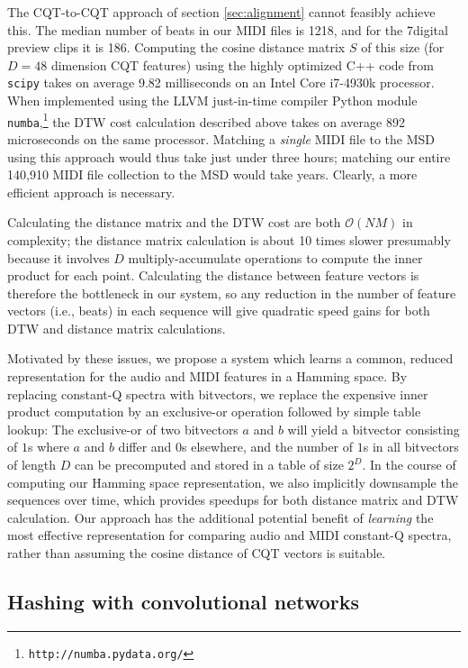 \documentclass{article}
\begin{document}
The CQT-to-CQT approach of section \ref{sec:alignment} cannot feasibly achieve this.
The median number of beats in our MIDI files is 1218, and for the 7digital preview clips it is 186.
Computing the cosine distance matrix $S$ of this size (for $D=48$ dimension CQT features) using the highly optimized C++ code from \texttt{scipy} \cite{jones2014scipy} takes on average 9.82 milliseconds on an Intel Core i7-4930k processor.
When implemented using the LLVM just-in-time compiler Python module \texttt{numba},\footnote{\texttt{http://numba.pydata.org/}} the DTW cost calculation described above takes on average 892 microseconds on the same processor.
Matching a \textit{single} MIDI file to the MSD using this approach would thus take just under three hours; matching our entire 140,910 MIDI file collection to the MSD would take years.
Clearly, a more efficient approach is necessary.

Calculating the distance matrix and the DTW cost are both $\mathcal{O}(NM)$ in complexity; the distance matrix calculation is about 10 times slower presumably because it involves $D$ multiply-accumulate operations to compute the inner product for each point.
Calculating the distance between feature vectors is therefore the bottleneck in our system, so any reduction in the number of feature vectors (i.e., beats) in each sequence will give quadratic speed gains for both DTW and distance matrix calculations.

Motivated by these issues, we propose a system which learns a common, reduced representation for the audio and MIDI features in a Hamming space.
By replacing constant-Q spectra with bitvectors, we replace the expensive inner product computation by an exclusive-or operation followed by simple table lookup: The exclusive-or of two bitvectors $a$ and $b$ will yield a bitvector consisting of $1$s where $a$ and $b$ differ and $0$s elsewhere, and the number of $1$s in all bitvectors of length $D$ can be precomputed and stored in a table of size $2^D$.  
In the course of computing our Hamming space representation, we also implicitly downsample the sequences over time, which provides speedups for both distance matrix and DTW calculation.
Our approach has the additional potential benefit of {\em learning} the most effective representation for comparing audio and MIDI constant-Q spectra, rather than assuming the cosine distance of CQT vectors is suitable.

\subsection{Hashing with convolutional networks}
\end{document}
